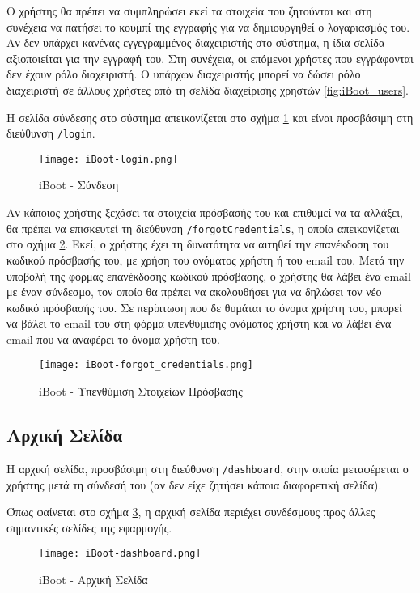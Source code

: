Ο χρήστης θα πρέπει να συμπληρώσει εκεί τα στοιχεία που ζητούνται και στη συνέχεια να πατήσει το κουμπί της εγγραφής για να δημιουργηθεί ο λογαριασμός του. Αν δεν υπάρχει κανένας εγγεγραμμένος διαχειριστής στο σύστημα, η ίδια σελίδα αξιοποιείται για την εγγραφή του. Στη συνέχεια, οι επόμενοι χρήστες που εγγράφονται δεν έχουν ρόλο διαχειριστή. Ο υπάρχων διαχειριστής μπορεί να δώσει ρόλο διαχειριστή σε άλλους χρήστες από τη σελίδα διαχείρισης χρηστών \ref{fig:iBoot_users}.

Η σελίδα σύνδεσης στο σύστημα απεικονίζεται στο σχήμα \ref{fig:iBoot_login} και είναι προσβάσιμη στη διεύθυνση \verb!/login!.
\begin{figure}[ht]
	\centering
	\texttt{[image: iBoot-login.png]}
	\caption{iBoot - Σύνδεση}
	\label{fig:iBoot_login}
\end{figure}

Αν κάποιος χρήστης ξεχάσει τα στοιχεία πρόσβασής του και επιθυμεί να τα αλλάξει, θα πρέπει να επισκευτεί τη διεύθυνση \verb!/forgotCredentials!, η οποία απεικονίζεται στο σχήμα \ref{fig:iBoot_forgot_credentials}. Εκεί, ο χρήστης έχει τη δυνατότητα να αιτηθεί την επανέκδοση του κωδικού πρόσβασής του, με χρήση του ονόματος χρήστη ή του email του. Μετά την υποβολή της φόρμας επανέκδοσης κωδικού πρόσβασης, ο χρήστης θα λάβει ένα email με έναν σύνδεσμο, τον οποίο θα πρέπει να ακολουθήσει για να δηλώσει τον νέο κωδικό πρόσβασής του. Σε περίπτωση που δε θυμάται το όνομα χρήστη του, μπορεί να βάλει το email του στη φόρμα υπενθύμισης ονόματος χρήστη και να λάβει ένα email που να αναφέρει το όνομα χρήστη του.
\begin{figure}[ht]
	\centering
	\texttt{[image: iBoot-forgot\_credentials.png]}
	\caption{iBoot - Υπενθύμιση Στοιχείων Πρόσβασης}
	\label{fig:iBoot_forgot_credentials}
\end{figure}
\FloatBarrier

\subsection{Αρχική Σελίδα}
\FloatBarrier
Η αρχική σελίδα, προσβάσιμη στη διεύθυνση \verb!/dashboard!, στην οποία μεταφέρεται ο χρήστης μετά τη σύνδεσή του (αν δεν είχε ζητήσει κάποια διαφορετική σελίδα).

Όπως φαίνεται στο σχήμα \ref{fig:iBoot_dashboard}, η αρχική σελίδα περιέχει συνδέσμους προς άλλες σημαντικές σελίδες της εφαρμογής.
\begin{figure}[ht]
	\centering
	\texttt{[image: iBoot-dashboard.png]}
	\caption{iBoot - Αρχική Σελίδα}
	\label{fig:iBoot_dashboard}
\end{figure}
\FloatBarrier

